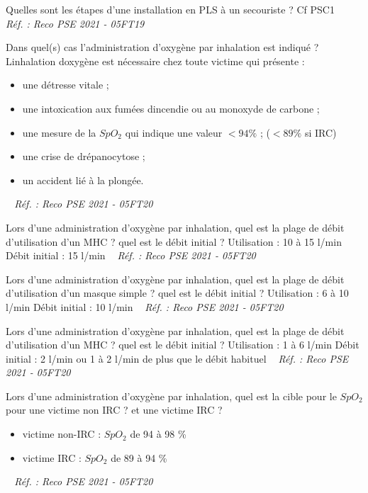 \documentclass[grid,avery5371,landscape]{flashcards}
\makeatletter
\newcounter{nocarte}
\newcommand{\categ}[1]{%
  \def\@categ{#1}%
  \setcounter{nocarte}{0}%
}
\newcommand{\source}[1]{%
  \medskip
  \itshape%
   ~ \hfill Réf. : #1}
\makeatother
\begin{document}
\color[HTML]{003273}
\categ{PSE}
\begin{flashcard}[geste]{
 Quelles sont les étapes d'une installation en PLS à un secouriste ?   }
  Cf PSC1
  \source{Reco PSE 2021 - 05FT19}
\end{flashcard}


\color[HTML]{003273}
\categ{PSE}
\begin{flashcard}[CAT]{
 Dans quel(s) cas l'administration d'oxygène par inhalation est indiqué ?   }
  Linhalation doxygène est nécessaire chez toute victime qui présente :
\begin{itemize}
\item une détresse vitale ;
\item une intoxication aux fumées dincendie ou au monoxyde de carbone ;
\item une mesure de la $SpO_2$ qui indique une valeur $< 94 \%$ ; ($< 89 \%$ si IRC)
\item une crise de drépanocytose ;
\item un accident lié à la plongée.
\end{itemize}
  \source{Reco PSE 2021 - 05FT20}
\end{flashcard}


\color[HTML]{003273}
\categ{PSE}
\begin{flashcard}[geste]{
 Lors d'une administration d'oxygène par inhalation, quel est la plage de débit d'utilisation d'un MHC ? quel est le débit initial ?   }
  Utilisation : 10 à 15 l/min
Débit initial : 15 l/min
  \source{Reco PSE 2021 - 05FT20}
\end{flashcard}


\color[HTML]{003273}
\categ{PSE}
\begin{flashcard}[geste]{
 Lors d'une administration d'oxygène par inhalation, quel est la plage de débit d'utilisation d'un masque simple ? quel est le débit initial ?   }
  Utilisation : 6 à 10 l/min
Débit initial : 10 l/min
  \source{Reco PSE 2021 - 05FT20}
\end{flashcard}


\color[HTML]{003273}
\categ{PSE}
\begin{flashcard}[geste]{
 Lors d'une administration d'oxygène par inhalation, quel est la plage de débit d'utilisation d'un MHC ? quel est le débit initial ?   }
  Utilisation : 1 à 6 l/min
Débit initial : 2 l/min ou 1 à 2 l/min de plus que le débit habituel
  \source{Reco PSE 2021 - 05FT20}
\end{flashcard}


\color[HTML]{003273}
\categ{PSE}
\begin{flashcard}[geste]{
 Lors d'une administration d'oxygène par inhalation, quel est la cible pour le $SpO_2$ pour une victime non IRC ? et une victime IRC ?   }
  \begin{itemize}
\item victime non-IRC : $SpO_2$ de 94 à 98 \%
\item victime IRC : $SpO_2$ de 89 à 94 \%
\end{itemize}
  \source{Reco PSE 2021 - 05FT20}
\end{flashcard}
\end{document}
